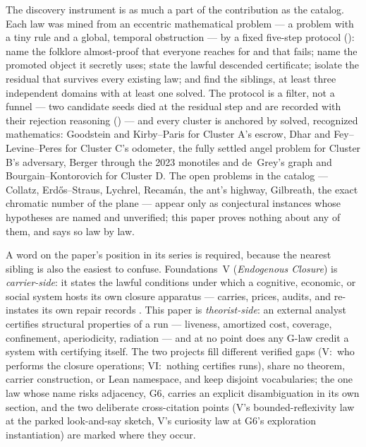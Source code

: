 \documentclass[11pt]{article}
\theoremstyle{definition}
\begin{document}
The discovery instrument is as much a part of the contribution as the catalog. Each law was mined
from an eccentric mathematical problem --- a problem with a tiny rule and a global, temporal
obstruction --- by a fixed five-step protocol (): name the folklore almost-proof
that everyone reaches for and that fails; name the promoted object it secretly uses; state the lawful
descended certificate; isolate the residual that survives every existing law; and find the siblings,
at least three independent domains with at least one solved. The protocol is a filter, not a funnel
--- two candidate seeds died at the residual step and are recorded with their rejection reasoning
() --- and every cluster is anchored by solved, recognized
mathematics: Goodstein and Kirby--Paris for Cluster A's escrow, Dhar and Fey--Levine--Peres for
Cluster C's odometer, the fully settled angel problem for Cluster B's adversary, Berger through the
2023 monotiles and de~Grey's graph and Bourgain--Kontorovich for Cluster D. The open problems in the
catalog --- Collatz, Erd\H{o}s--Straus, Lychrel, Recam\'an, the ant's highway, Gilbreath, the exact
chromatic number of the plane --- appear only as conjectural instances whose hypotheses are named and
unverified; this paper proves nothing about any of them, and  says so law by law.

A word on the paper's position in its series is required, because the nearest sibling is also the
easiest to confuse. Foundations~V (\emph{Endogenous Closure}) is \emph{carrier-side}: it states the
lawful conditions under which a cognitive, economic, or social system hosts its own closure apparatus
--- carries, prices, audits, and re-instates its own repair records \citep{FoundationsVCognition}.
This paper is \emph{theorist-side}: an external analyst certifies structural properties of a run ---
liveness, amortized cost, coverage, confinement, aperiodicity, radiation --- and at no point does any
G-law credit a system with certifying itself. The two projects fill different verified gaps (V:\ who
performs the closure operations; VI:\ nothing certifies runs), share no theorem, carrier
construction, or Lean namespace, and keep disjoint vocabularies; the one law whose name risks
adjacency, G6, carries an explicit disambiguation in its own section, and the two deliberate
cross-citation points (V's bounded-reflexivity law at the parked look-and-say sketch, V's curiosity
law at G6's exploration instantiation) are marked where they occur.
\end{document}
